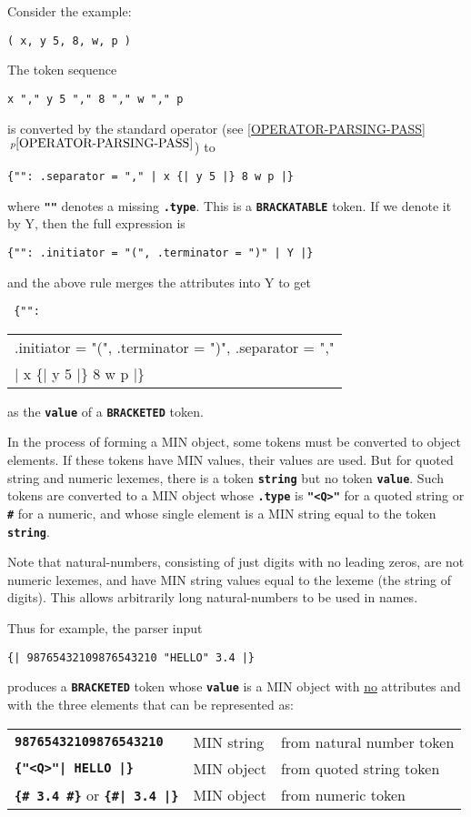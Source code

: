 \documentclass[12pt]{article}
\newcommand{\TT}[1]{{\tt \bfseries #1}}
\newcommand{\itemref}[1]{\ref{#1}$\,^{p\pageref{#1}}$}
\begin{document}
Consider the example:
\begin{center}
\tt ( x, y 5, 8, w, p )
\end{center}

The token sequence
\begin{center}
\tt x "," y 5 "," 8 "," w "," p
\end{center}
is converted by the standard operator (see \itemref{OPERATOR-PARSING-PASS})
to
\begin{center}
\tt \{"": .separator = "," | x  \{| y 5 |\} 8 w p |\}
\end{center}
where \TT{""} denotes a missing \TT{.type}.  This is a \TT{BRACKATABLE}
token.  If we denote it by Y,
then the full expression is
\begin{center}
\tt \{"": .initiator = "(", .terminator = ")" | Y |\}
\end{center}
and the above rule merges the attributes into Y to get
\begin{center}
\tt
\{"": \begin{tabular}[t]{l}
      .initiator = "(", .terminator = ")", .separator = "," \\
      | x  \{| y 5 |\} 8 w p |\}
      \end{tabular}
\end{center}
as the \TT{value} of a \TT{BRACKETED} token.

In the process of forming a MIN object, some tokens must be converted to
object elements.  If these tokens have MIN values, their values are used.
But for quoted string and numeric lexemes, there is a token \TT{string}
but no token \TT{value}.  Such tokens are converted to a MIN object
whose \TT{.type} is \TT{"<Q>"} for a quoted string or \TT{\#} for
a numeric, and whose single element is a MIN string equal to the
token \TT{string}.

Note that natural-numbers, consisting of just digits
with no leading zeros, are not numeric lexemes, and have MIN string
values equal to the lexeme (the string of digits).  This allows
arbitrarily long natural-numbers to be used in names.

Thus for example, the parser input
\begin{center}
\tt \{| 98765432109876543210 "HELLO" 3.4 |\}
\end{center}
produces a \TT{BRACKETED} token whose \TT{value} is a MIN object with
\underline{no} attributes and with the three elements that
can be represented as:
\begin{center}
\begin{tabular}{lll}
\TT{98765432109876543210}	& MIN string	& from natural number token \\
\TT{\{"<Q>"| HELLO |\}}		& MIN object	& from quoted string token \\
\TT{\{\# 3.4 \#\}} or \TT{\{\#| 3.4 |\}}
				& MIN object	& from numeric token \\
\end{tabular}
\end{center}
\end{document}

